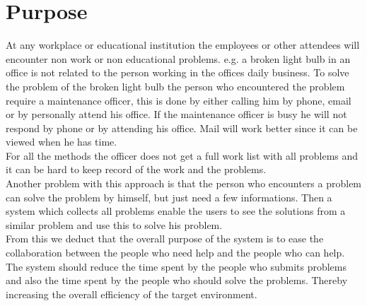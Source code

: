 \newcommand{\lightbulb}{light bulb}
\section{Purpose}
At any workplace or educational institution the employees or other attendees will encounter non work or non educational problems. 
e.g. a broken \lightbulb{} in an office is not related to the person working in the offices daily business. 
To solve the problem of the broken \lightbulb{} the person who encountered the problem require a maintenance officer, this is done by either calling him by phone, email or by personally attend his office. 
If the maintenance officer is busy he will not respond by phone or by attending his office. Mail will work better since it can be viewed when he has time.\\

For all the methods the officer does not get a full work list with all problems and it can be hard to keep record of the work and the problems.\\
Another problem with this approach is that the person who encounters a problem can solve the problem by himself, but just need a few informations. Then a system which collects all problems enable the users to see the solutions from a similar problem and use this to solve his problem. \\

From this we deduct that the overall purpose of the system is to ease the collaboration between the people who need help and the people who can help. \\
The system should reduce the time spent by the people who submits problems and also the time spent by the people who should solve the problems.
Thereby increasing the overall efficiency of the target environment. 

